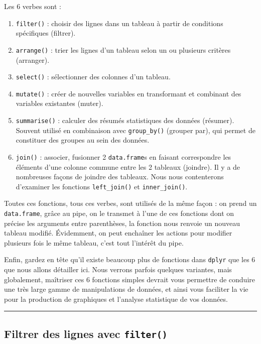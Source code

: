 \documentclass[
  a4paper,
]{article}
\providecommand{\tightlist}{%
  \setlength{\itemsep}{0pt}\setlength{\parskip}{0pt}}
\begin{document}
Les 6 verbes sont :

\begin{enumerate}
\def\labelenumi{\arabic{enumi}.}
\tightlist
\item
  \texttt{filter()} : choisir des lignes dans un tableau à partir de conditions spécifiques (filtrer).
\item
  \texttt{arrange()} : trier les lignes d'un tableau selon un ou plusieurs critères (arranger).
\item
  \texttt{select()} : sélectionner des colonnes d'un tableau.
\item
  \texttt{mutate()} : créer de nouvelles variables en transformant et combinant des variables existantes (muter).
\item
  \texttt{summarise()} : calculer des résumés statistiques des données (résumer). Souvent utilisé en combinaison avec \texttt{group\_by()} (grouper par), qui permet de constituer des groupes au sein des données.
\item
  \texttt{join()} : associer, fusionner 2 \texttt{data.frame}s en faisant correspondre les éléments d'une colonne commune entre les 2 tableaux (joindre). Il y a de nombreuses façons de joindre des tableaux. Nous nous contenterons d'examiner les fonctions \texttt{left\_join()} et \texttt{inner\_join()}.
\end{enumerate}

Toutes ces fonctions, tous ces verbes, sont utilisés de la même façon : on prend un \texttt{data.frame}, grâce au pipe, on le transmet à l'une de ces fonctions dont on précise les arguments entre parenthèses, la fonction nous renvoie un nouveau tableau modifié. Évidemment, on peut enchaîner les actions pour modifier plusieurs fois le même tableau, c'est tout l'intérêt du pipe.

Enfin, gardez en tête qu'il existe beaucoup plus de fonctions dans \texttt{dplyr} que les 6 que nous allons détailler ici. Nous verrons parfois quelques variantes, mais globalement, maîtriser ces 6 fonctions simples devrait vous permettre de conduire une très large gamme de manipulations de données, et ainsi vous faciliter la vie pour la production de graphiques et l'analyse statistique de vos données.

\begin{center}\rule{0.5\linewidth}{0.5pt}\end{center}

\hypertarget{filtrer-des-lignes-avec-filter}{%
\subsection{\texorpdfstring{Filtrer des lignes avec \texttt{filter()}}{Filtrer des lignes avec filter()}}\label{filtrer-des-lignes-avec-filter}}
\end{document}
